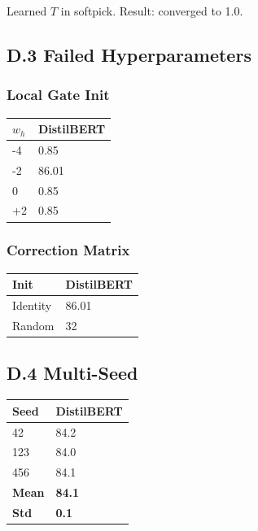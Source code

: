 Learned $T$ in softpick. Result: converged to 1.0.

\subsection{D.3 Failed Hyperparameters}

\subsubsection{Local Gate Init}

\begin{table}[H]
\centering
\small
\begin{tabular}{ll}
\toprule
\textbf{$w_h$} & \textbf{DistilBERT} \\
\midrule
-4 & 0.85 \\
-2 & 86.01 \\
0 & 0.85 \\
+2 & 0.85 \\
\bottomrule
\end{tabular}
\end{table}

\subsubsection{Correction Matrix}

\begin{table}[H]
\centering
\small
\begin{tabular}{ll}
\toprule
\textbf{Init} & \textbf{DistilBERT} \\
\midrule
Identity & 86.01 \\
Random & 32 \\
\bottomrule
\end{tabular}
\end{table}

\subsection{D.4 Multi-Seed}

\begin{table}[H]
\centering
\small
\begin{tabular}{ll}
\toprule
\textbf{Seed} & \textbf{DistilBERT} \\
\midrule
42 & 84.2 \\
123 & 84.0 \\
456 & 84.1 \\
\textbf{Mean} & \textbf{84.1} \\
\textbf{Std} & \textbf{0.1} \\
\bottomrule
\end{tabular}
\end{table}

